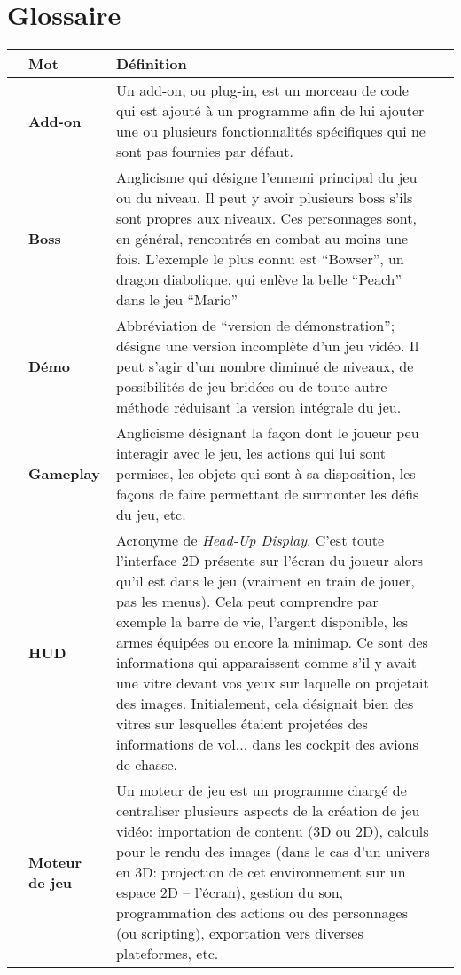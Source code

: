 \startcontents[chapters]
\chapter{Glossaire}

\newpage

\label{chap:vocabulaire}
\begin{center}
	\begin{longtabu} to 
		\rowfont{\bfseries\sffamily\leavevmode\color{white}}
		& Mot & Définition & \\
		\endhead
		\endfoot
		& Add-on & Un add-on, ou plug-in, est un morceau de code qui est ajouté à un programme afin de lui ajouter une ou plusieurs fonctionnalités spécifiques qui ne sont pas fournies par défaut. & \\
		& Boss & Anglicisme qui désigne l'ennemi principal du jeu ou du niveau. Il peut y avoir plusieurs boss s'ils sont propres aux niveaux. Ces personnages sont, en général, rencontrés en combat au moins une fois. L'exemple le plus connu est \enquote{Bowser}, un dragon diabolique, qui enlève la belle \enquote{Peach} dans le jeu \enquote{Mario} & \\
		& Démo & Abbréviation de \enquote{version de démonstration}; désigne une version incomplète d'un jeu vidéo. Il peut s'agir d'un nombre diminué de niveaux, de possibilités de jeu bridées ou de toute autre méthode réduisant la version intégrale du jeu. & \\
		& Gameplay & Anglicisme désignant la façon dont le joueur peu interagir avec le jeu, les actions qui lui sont permises, les objets qui sont à sa disposition, les façons de faire permettant de surmonter les défis du jeu, etc. & \\
		& HUD & Acronyme de \textit{Head-Up Display}. C'est toute l'interface 2D présente sur l'écran du joueur alors qu'il est dans le jeu (vraiment en train de jouer, pas les menus). Cela peut comprendre par exemple la barre de vie, l'argent disponible, les armes équipées ou encore la minimap. Ce sont des informations qui apparaissent comme s'il y avait une vitre devant vos yeux sur laquelle on projetait des images. Initialement, cela désignait bien des vitres sur lesquelles étaient projetées des informations de vol... dans les cockpit des avions de chasse. & \\
		& Moteur de jeu & Un moteur de jeu est un programme chargé de centraliser plusieurs aspects de la création de jeu vidéo: importation de contenu (3D ou 2D), calculs pour le rendu des images (dans le cas d'un univers en 3D: projection de cet environnement sur un espace 2D -- l'écran), gestion du son, programmation des actions ou des personnages (ou scripting), exportation vers diverses plateformes, etc. & \\

\end{longtabu}
\end{center}
